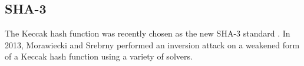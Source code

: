 \subsection{SHA-3}
\label{sec:encoding:keccak}

The Keccak hash function was recently chosen as the new SHA-3 standard \cite{USDOC15}. In 2013, Morawiecki and Srebrny \cite{MS13} performed an inversion attack on a weakened form of a {Keccak} hash function using a variety of solvers. 